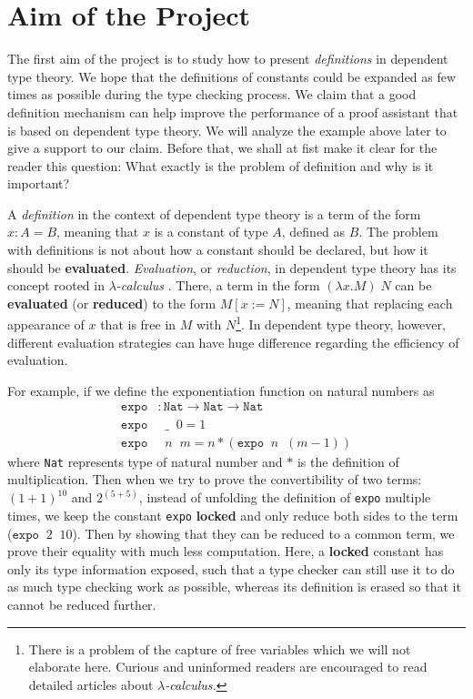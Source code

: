 \section{Aim of the Project}
The first aim of the project is to study how to present \emph{definitions} in dependent type theory. We hope that the definitions of constants could be expanded as few times as possible during the type checking process. We claim that a good definition mechanism can help improve the performance of a proof assistant that is based on dependent type theory. We will analyze the example above later to give a support to our claim. Before that, we shall at fist make it clear for the reader this question: What exactly is the problem of definition and why is it important?

A \emph{definition} in the context of dependent type theory is a term of the form $x : A = B$, meaning that $x$ is a constant of type $A$, defined as $B$. The problem with definitions is not about how a constant should be declared, but how it should be \textbf{evaluated}. \emph{Evaluation}, or \emph{reduction}, in dependent type theory has its concept rooted in \emph{$\lambda$-calculus} \cite{barendregt1984lambda}. There, a term in the form $(\lambda x . M) \;N$ can be \textbf{evaluated} (or \textbf{reduced}) to the form $M[x := N]$, meaning that replacing each appearance of $x$ that is free in $M$ with $N$\footnote{There is a problem of the capture of free variables which we will not elaborate here. Curious and uninformed readers are encouraged to read detailed articles about \emph{$\lambda$-calculus.}}. In dependent type theory, however, different evaluation strategies can have huge difference regarding the efficiency of evaluation. 

For example, if we define the exponentiation function on natural numbers as
\begin{align*}
  \texttt{expo} &: \texttt{Nat} \to \texttt{Nat} \to \texttt{Nat} \\
  \texttt{expo} &\;\; \_\;\; 0 = 1 \\
  \texttt{expo} &\;\; n \;\; m = n * (\texttt{expo} \;\; n \;\; (m - 1))
\end{align*}
where \texttt{Nat} represents type of natural number and $*$ is the definition of multiplication. Then when we try to prove the convertibility of two terms: $(1 + 1)^{10}$ and $2 ^ {(5+5)}$, instead of unfolding the definition of \texttt{expo} multiple times, we keep the constant \texttt{expo} \textbf{locked} and only reduce both sides to the term ($\texttt{expo} \;\; 2 \;\; 10$). Then by showing that they can be reduced to a common term, we prove their equality with much less computation. Here, a \textbf{locked} constant has only its type information exposed, such that a type checker can still use it to do as much type checking work as possible, whereas its definition is erased so that it cannot be reduced further.

